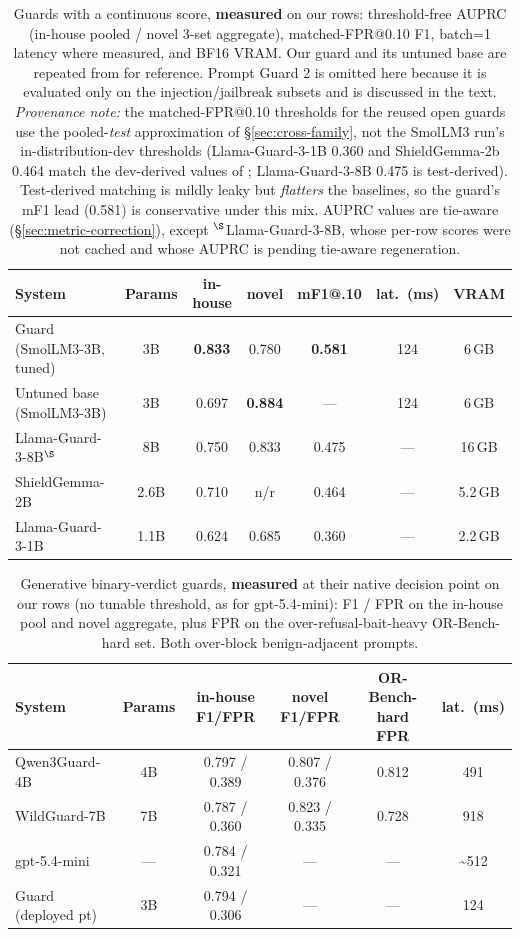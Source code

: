 \begin{table}[t]
\small\centering\setlength{\tabcolsep}{4pt}
\caption{Guards with a continuous score, \textbf{measured} on our rows: threshold-free AUPRC (in-house pooled / novel 3-set aggregate), matched-FPR@0.10 F1, batch=1 latency where measured, and BF16 VRAM. Our guard and its untuned base are repeated from  for reference. Prompt Guard 2 is omitted here because it is evaluated only on the injection/jailbreak subsets and is discussed in the text. \emph{Provenance note:} the matched-FPR@0.10 thresholds for the reused open guards use the pooled-\emph{test} approximation of \S\ref{sec:cross-family}, not the SmolLM3 run's in-distribution-dev thresholds (Llama-Guard-3-1B 0.360 and ShieldGemma-2b 0.464 match the dev-derived values of ; Llama-Guard-3-8B 0.475 is test-derived). Test-derived matching is mildly leaky but \emph{flatters} the baselines, so the guard's mF1 lead (0.581) is conservative under this mix. AUPRC values are tie-aware (\S\ref{sec:metric-correction}), except $^\S$Llama-Guard-3-8B, whose per-row scores were not cached and whose AUPRC is pending tie-aware regeneration.}
\label{tab:gr-auprc}
\begin{tabular}{lcccccc}
\toprule
System & Params & in-house & novel & mF1@.10 & lat.\ (ms) & VRAM \\
\midrule
Guard (SmolLM3-3B, tuned) & 3B & \textbf{0.833} & 0.780 & \textbf{0.581} & 124 & 6\,GB \\
Untuned base (SmolLM3-3B) & 3B & 0.697 & \textbf{0.884} & --- & 124 & 6\,GB \\
Llama-Guard-3-8B$^\S$     & 8B & 0.750 & 0.833 & 0.475 & --- & 16\,GB \\
ShieldGemma-2B            & 2.6B & 0.710 & n/r & 0.464 & --- & 5.2\,GB \\
Llama-Guard-3-1B          & 1.1B & 0.624 & 0.685 & 0.360 & --- & 2.2\,GB \\
\bottomrule
\end{tabular}
\end{table}

\begin{table}[t]
\small\centering\setlength{\tabcolsep}{4pt}
\caption{Generative binary-verdict guards, \textbf{measured} at their native decision point on our rows (no tunable threshold, as for gpt-5.4-mini): F1 / FPR on the in-house pool and novel aggregate, plus FPR on the over-refusal-bait-heavy OR-Bench-hard set. Both over-block benign-adjacent prompts.}
\label{tab:gr-native}
\begin{tabular}{lccccc}
\toprule
System & Params & in-house F1/FPR & novel F1/FPR & OR-Bench-hard FPR & lat.\ (ms) \\
\midrule
Qwen3Guard-4B & 4B & 0.797 / 0.389 & 0.807 / 0.376 & 0.812 & 491 \\
WildGuard-7B  & 7B & 0.787 / 0.360 & 0.823 / 0.335 & 0.728 & 918 \\
gpt-5.4-mini  & --- & 0.784 / 0.321 & --- & --- & \textasciitilde{}512 \\
Guard (deployed pt) & 3B & 0.794 / 0.306 & --- & --- & 124 \\
\bottomrule
\end{tabular}
\end{table}

